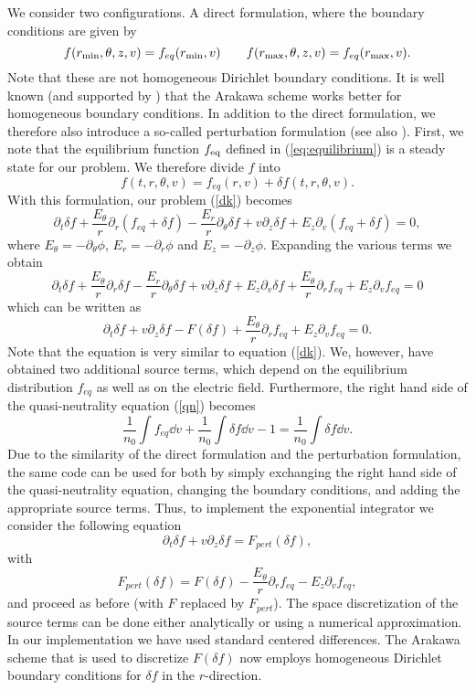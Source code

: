 We consider two configurations. A direct formulation, where the boundary conditions are given by
$$
  f(r_{\rm min},\theta ,z,v)=f_{eq}(r_{\rm min},v) \qquad
  f(r_{\rm max},\theta ,z,v)=f_{eq}(r_{\rm max},v).
$$
Note that these are not homogeneous Dirichlet boundary conditions. It is well known (and supported by \cite{Crouseilles:2018}) that the Arakawa scheme works better for homogeneous boundary conditions. In addition to the direct formulation, we therefore also introduce a so-called perturbation formulation (see also \cite{Crouseilles:2014, Latu:2014}). First, we note that the equilibrium function $f_{\rm eq}$ defined in (\ref{eq:equilibrium}) is a steady state for our problem. We therefore divide $f$ into
$$
  f(t,r,\theta ,v)=f_{eq}(r,v)+\delta f(t,r,\theta ,v).
$$
With this formulation, our problem (\ref{dk}) becomes
$$
  \partial_t\delta f+\frac{E_\theta}{r}\partial_r (f_{eq} + \delta f)-\frac{E_r}{r}\partial_\theta \delta f+v\partial_z\delta f+E_z \partial_v (f_{eq} + \delta f)=0,
$$
where $E_\theta=-\partial_\theta \phi$, $E_r=-\partial_r \phi$ and $E_z=-\partial_z \phi$. Expanding the various terms we obtain
$$
  \partial_t\delta f+\frac{E_\theta}{r}\partial_r\delta f-\frac{E_r}{r}\partial_\theta \delta f+v\partial_z\delta f+ E_z \partial_v \delta f
  +\frac{E_\theta}{r}\partial_r f_{eq} + E_z \partial _v f_{eq}=0
$$
which can be written as
$$
  \partial_t\delta f + v\partial_z \delta f -F(\delta f) +\frac{E_\theta}{r}\partial_r f_{eq} +E_z\partial _v f_{eq} = 0.
$$
Note that the equation is very similar to equation (\ref{dk}). We, however, have obtained two additional source terms, which depend on the equilibrium distribution $f_{eq}$ as well as on the electric field. Furthermore, the right hand side of the quasi-neutrality equation (\ref{qn}) becomes
$$
  \frac{1}{n_0}\int f_{eq} \dd{v}+\frac{1}{n_0}\int \delta f \dd{v} - 1 = \frac{1}{n_0}\int \delta f \dd{v}.
$$
Due to the similarity of the direct formulation and the perturbation formulation, the same code can be used for both by simply exchanging the right hand side of the quasi-neutrality equation, changing the boundary conditions, and adding the appropriate source terms. Thus, to implement the exponential integrator we consider the following equation 
$$
  \partial_t\delta f + v\partial_z \delta f  = F_{pert}(\delta f),
$$
with
$$
  F_{pert} (\delta f)= F(\delta f) -\frac{E_\theta}{r}\partial_r f_{eq} - E_z\partial _v f_{eq},
$$
and proceed as before (with $F$ replaced by $F_{pert}$). The space discretization of the source terms can be done either analytically or using a numerical approximation. In our implementation we have used standard centered differences. The Arakawa scheme that is used to discretize $F(\delta f)$ now employs homogeneous Dirichlet boundary conditions for $\delta f$ in the $r$-direction.


